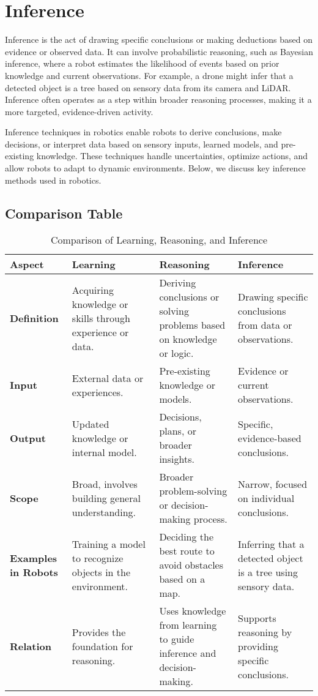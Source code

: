 \section{Inference}
Inference is the act of drawing specific conclusions or making deductions based on evidence or observed data. It can involve probabilistic reasoning, such as Bayesian inference, where a robot estimates the likelihood of events based on prior knowledge and current observations. For example, a drone might infer that a detected object is a tree based on sensory data from its camera and LiDAR. Inference often operates as a step within broader reasoning processes, making it a more targeted, evidence-driven activity. 

Inference techniques in robotics enable robots to derive conclusions, make decisions, or interpret data based on sensory inputs, learned models, and pre-existing knowledge. These techniques handle uncertainties, optimize actions, and allow robots to adapt to dynamic environments. Below, we discuss key inference methods used in robotics.



\subsection{Comparison Table}
\begin{table}[h!]
    \centering
    \begin{tabular}{|l|l|l|l|}
        \hline
        \textbf{Aspect} & \textbf{Learning} & \textbf{Reasoning} & \textbf{Inference} \\ \hline
        \textbf{Definition} & Acquiring knowledge or skills through experience or data. & Deriving conclusions or solving problems based on knowledge or logic. & Drawing specific conclusions from data or observations. \\ \hline
        \textbf{Input} & External data or experiences. & Pre-existing knowledge or models. & Evidence or current observations. \\ \hline
        \textbf{Output} & Updated knowledge or internal model. & Decisions, plans, or broader insights. & Specific, evidence-based conclusions. \\ \hline
        \textbf{Scope} & Broad, involves building general understanding. & Broader problem-solving or decision-making process. & Narrow, focused on individual conclusions. \\ \hline
        \textbf{Examples in Robots} & Training a model to recognize objects in the environment. & Deciding the best route to avoid obstacles based on a map. & Inferring that a detected object is a tree using sensory data. \\ \hline
        \textbf{Relation} & Provides the foundation for reasoning. & Uses knowledge from learning to guide inference and decision-making. & Supports reasoning by providing specific conclusions. \\ \hline
    \end{tabular}
    \caption{Comparison of Learning, Reasoning, and Inference}
\end{table}
